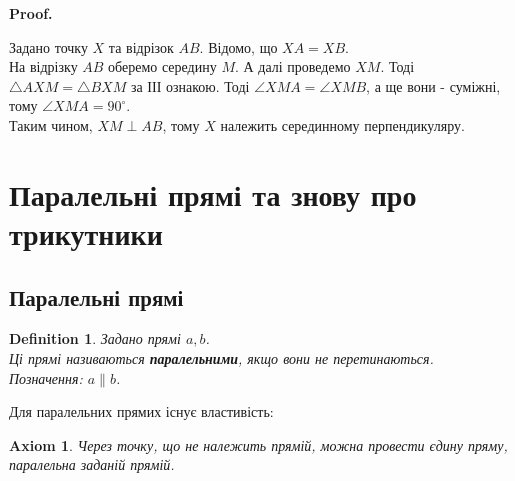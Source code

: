 \documentclass[a4paper, 10pt]{article}
\makeatletter
\def\qed{$\blacksquare$}
\theoremstyle{theoremdd}
\theoremstyle{theoremdd}
\newtheorem{axiom}{Axiom}
\theoremstyle{theoremdd}
\newtheorem{definition}[theorem]{Definition}
\theoremstyle{theoremdd}
\theoremstyle{theoremdd}
\theoremstyle{theoremdd}
\theoremstyle{theoremdd}
\theoremstyle{theoremdd}
\theoremstyle{theoremdd}
\renewenvironment{proof}[1][Proof.\\]{\par
\pushQED{\hfill \qed}%
\normalfont \topsep6\p@\@plus6\p@\relax
\trivlist
\item\relax
{\bfseries
#1\@addpunct{.}}\hspace\labelsep\ignorespaces
}{%
\popQED\endtrivlist\@endpefalse
}
\makeatother
\begin{document}
\begin{proof}
Задано точку $X$ та відрізок $AB$. Відомо, що $XA =XB$.\\
На відрізку $AB$ оберемо середину $M$. А далі проведемо $XM$. Тоді $\triangle AXM = \triangle BXM$ за ІІІ ознакою. Тоді $\angle XMA = \angle XMB$, а ще вони - суміжні, тому $\angle XMA = 90^\circ$.\\
Таким чином, $XM \perp AB$, тому $X$ належить серединному перпендикуляру.
\begin{figure}[H]
\centering
{}
\end{figure}
\end{proof}
\newpage

\section{Паралельні прямі та знову про трикутники}
\subsection{Паралельні прямі}
\begin{definition}
Задано прямі $a,b$.\\
Ці прямі називаються \textbf{паралельними}, якщо вони не перетинаються.\\
Позначення: $a \parallel b$.
\begin{figure}[H]
\centering
{}
\end{figure}
\end{definition}

Для паралельних прямих існує властивість:
\begin{axiom}
Через точку, що не належить прямій, можна провести єдину пряму, паралельна заданій прямій.
\end{axiom}
\end{document}
